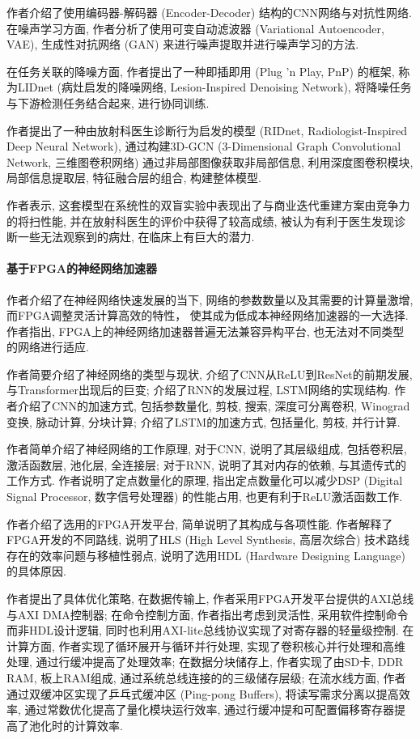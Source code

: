 \documentclass[]{ctexart}
\begin{document}
	作者介绍了使用编码器-解码器 (Encoder-Decoder) 结构的CNN网络与对抗性网络. 在噪声学习方面, 作者分析了使用可变自动滤波器 (Variational Autoencoder, VAE), 生成性对抗网络 (GAN) 来进行噪声提取并进行噪声学习的方法. 
	
	在任务关联的降噪方面, 作者提出了一种即插即用 (Plug 'n Play, PnP) 的框架, 称为LIDnet (病灶启发的降噪网络, Lesion-Inspired Denoising Network), 将降噪任务与下游检测任务结合起来, 进行协同训练. 
	
	作者提出了一种由放射科医生诊断行为启发的模型 (RIDnet, Radiologist-Inspired Deep Neural Network), 通过构建3D-GCN (3-Dimensional Graph Convolutional Network, 三维图卷积网络) 通过非局部图像获取非局部信息, 利用深度图卷积模块, 局部信息提取层, 特征融合层的组合, 构建整体模型. 
	
	作者表示, 这套模型在系统性的双盲实验中表现出了与商业迭代重建方案由竞争力的将扫性能, 并在放射科医生的评价中获得了较高成绩, 被认为有利于医生发现诊断一些无法观察到的病灶, 在临床上有巨大的潜力. 
	
\paragraph{基于FPGA的神经网络加速器\cite{fpgaAccelerate}} 作者介绍了在神经网络快速发展的当下, 网络的参数数量以及其需要的计算量激增, 而FPGA调整灵活计算高效的特性， 使其成为低成本神经网络加速器的一大选择. 作者指出, FPGA上的神经网络加速器普遍无法兼容异构平台, 也无法对不同类型的网络进行适应. 

	作者简要介绍了神经网络的类型与现状, 介绍了CNN从ReLU到ResNet的前期发展, 与Transformer\cite{transformer}出现后的巨变; 介绍了RNN的发展过程, LSTM网络的实现结构. 作者介绍了CNN的加速方式, 包括参数量化, 剪枝, 搜索, 深度可分离卷积, Winograd变换, 脉动计算, 分块计算; 介绍了LSTM的加速方式, 包括量化, 剪枝, 并行计算. 
	
	作者简单介绍了神经网络的工作原理, 对于CNN, 说明了其层级组成, 包括卷积层, 激活函数层, 池化层, 全连接层; 对于RNN, 说明了其对内存的依赖, 与其遗传式的工作方式. 作者说明了定点数量化的原理, 指出定点数量化可以减少DSP (Digital Signal Processor, 数字信号处理器) 的性能占用, 也更有利于ReLU激活函数工作. 
	
	作者介绍了选用的FPGA开发平台, 简单说明了其构成与各项性能. 作者解释了FPGA开发的不同路线, 说明了HLS (High Level Synthesis, 高层次综合) 技术路线存在的效率问题与移植性弱点, 说明了选用HDL (Hardware Designing Language) 的具体原因. 
	
	作者提出了具体优化策略, 在数据传输上, 作者采用FPGA开发平台提供的AXI总线与AXI DMA控制器; 在命令控制方面, 作者指出考虑到灵活性, 采用软件控制命令而非HDL设计逻辑, 同时也利用AXI-lite总线协议实现了对寄存器的轻量级控制. 在计算方面, 作者实现了循环展开与循环并行处理, 实现了卷积核心并行处理和高维处理, 通过行缓冲提高了处理效率; 在数据分块储存上, 作者实现了由SD卡, DDR RAM, 板上RAM组成, 通过系统总线连接的的三级储存层级; 在流水线方面, 作者通过双缓冲区实现了乒乓式缓冲区 (Ping-pong Buffers), 将读写需求分离以提高效率, 通过常数优化提高了量化模块运行效率, 通过行缓冲提和可配置偏移寄存器提高了池化时的计算效率. 
	
\end{document}
